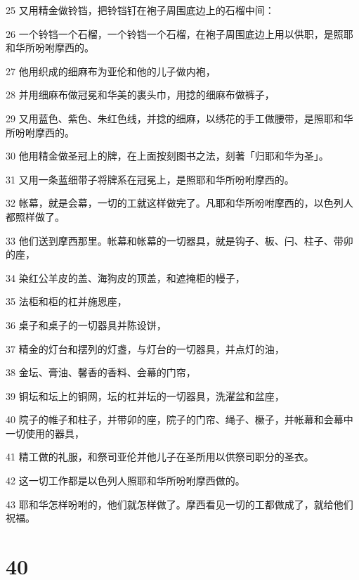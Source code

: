 \par 25 又用精金做铃铛，把铃铛钉在袍子周围底边上的石榴中间：
\par 26 一个铃铛一个石榴，一个铃铛一个石榴，在袍子周围底边上用以供职，是照耶和华所吩咐摩西的。
\par 27 他用织成的细麻布为亚伦和他的儿子做内袍，
\par 28 并用细麻布做冠冕和华美的裹头巾，用捻的细麻布做裤子，
\par 29 又用蓝色、紫色、朱红色线，并捻的细麻，以绣花的手工做腰带，是照耶和华所吩咐摩西的。
\par 30 他用精金做圣冠上的牌，在上面按刻图书之法，刻著「归耶和华为圣」。
\par 31 又用一条蓝细带子将牌系在冠冕上，是照耶和华所吩咐摩西的。
\par 32 帐幕，就是会幕，一切的工就这样做完了。凡耶和华所吩咐摩西的，以色列人都照样做了。
\par 33 他们送到摩西那里。帐幕和帐幕的一切器具，就是钩子、板、闩、柱子、带卯的座，
\par 34 染红公羊皮的盖、海狗皮的顶盖，和遮掩柜的幔子，
\par 35 法柜和柜的杠并施恩座，
\par 36 桌子和桌子的一切器具并陈设饼，
\par 37 精金的灯台和摆列的灯盏，与灯台的一切器具，并点灯的油，
\par 38 金坛、膏油、馨香的香料、会幕的门帘，
\par 39 铜坛和坛上的铜网，坛的杠并坛的一切器具，洗濯盆和盆座，
\par 40 院子的帷子和柱子，并带卯的座，院子的门帘、绳子、橛子，并帐幕和会幕中一切使用的器具，
\par 41 精工做的礼服，和祭司亚伦并他儿子在圣所用以供祭司职分的圣衣。
\par 42 这一切工作都是以色列人照耶和华所吩咐摩西做的。
\par 43 耶和华怎样吩咐的，他们就怎样做了。摩西看见一切的工都做成了，就给他们祝福。

\chapter{40}

